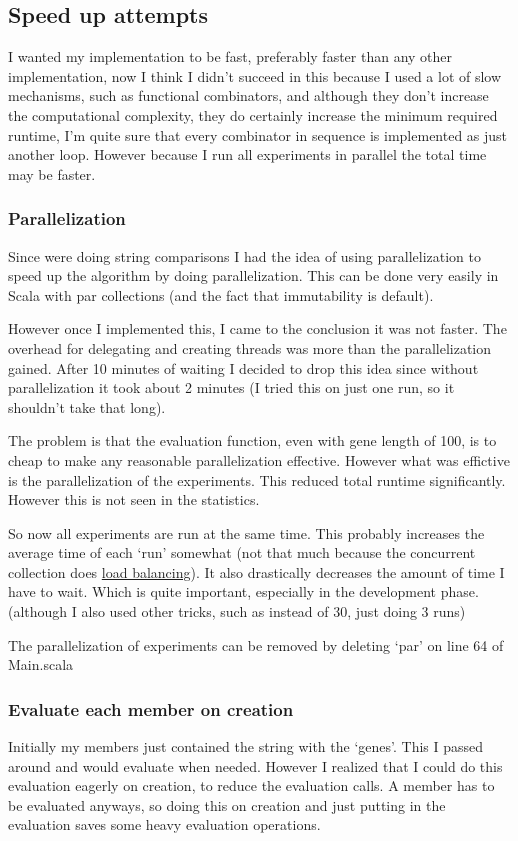 \documentclass{article}
\begin{document}
\begin{empfile}
\subsection{Speed up attempts}
I wanted my implementation to be fast, preferably faster than any other
implementation, now I think I didn't succeed in this because I used a
lot of slow mechanisms, such as functional combinators, and although
they don't increase the computational complexity, they do certainly increase
the minimum required runtime, I'm quite sure that every combinator in sequence
is implemented as just another loop. However because I
run all experiments in parallel the total time may be faster.
\subsubsection{Parallelization}
Since were doing string comparisons I had the idea of using parallelization to
speed up the algorithm by doing parallelization. This can be done very easily
in Scala with par collections (and the fact that immutability is default).

However once I implemented this, I came to the conclusion it was not faster.
The overhead for delegating and creating threads was more than the parallelization
gained.  After 10 minutes of waiting I decided to drop this idea
since without parallelization it took about 2 minutes (I tried this
on just one run, so it shouldn't take that long).

The problem is that the evaluation function, even with gene length of 100, is
to cheap to make any reasonable parallelization effective. However what was effictive
is the parallelization of the experiments. This reduced total runtime
significantly. However this is not seen in the statistics.

So now all experiments are run at the same time. This probably increases the
average time of each `run' somewhat (not that much because the concurrent
collection does \href{http://docs.scala-lang.org/overviews/parallel-collections/configuration.html}{load balancing}).
It also drastically decreases the amount of time I have to wait. Which is quite
important, especially in the development phase. (although I also used
other tricks, such as instead of 30, just doing 3 runs)

The parallelization of experiments can be removed by deleting `par' on line 64
of Main.scala

\subsubsection{Evaluate each member on creation}
Initially my members just contained the string with the `genes'. This I passed
around and would evaluate when needed. However I realized that I could do this
evaluation eagerly on creation, to reduce the evaluation calls. A member has
to be evaluated anyways, so doing this on creation and just putting in the
evaluation saves some heavy evaluation operations.


\end{empfile}
\end{document}
